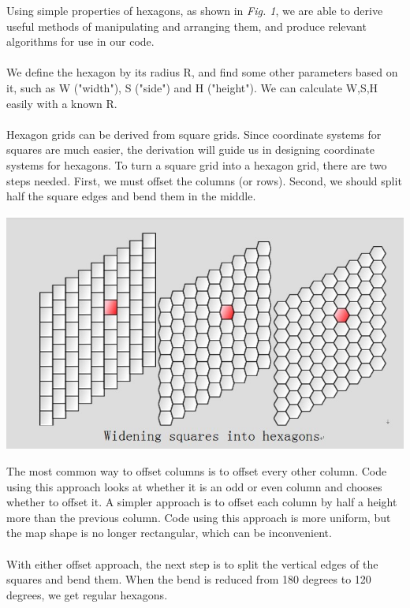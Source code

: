 \documentclass[10pt,a4paper]{article}
\begin{document}
Using simple properties of hexagons, as shown in \textit{Fig. 1}, we are able to derive useful methods of manipulating and arranging them, and produce relevant algorithms for use in our code. \\
\\
We define the hexagon by its radius R, and find some other parameters based on it, such as W ("width"), S ("side") and H ("height"). We can calculate W,S,H easily with a known R.\\
\\
Hexagon grids can be derived from square grids. Since coordinate systems for squares are much easier, the derivation will guide us in designing coordinate systems for hexagons\cite{grids}. To turn a square grid into a hexagon grid, there are two steps needed. First, we must offset the columns (or rows). Second, we should split half the square edges and bend them in the middle.
\begin{center}
\includegraphics[scale=0.5]{image11.jpg}\\
\end{center}
The most common way \cite{gdmath} to offset columns is to offset every other column. Code using this approach looks at whether it is an odd or even column and chooses whether to offset it. A simpler approach is to offset each column by half a height more than the previous column. Code using this approach is more uniform, but the map shape is no longer rectangular, which can be inconvenient.\\
\\
With either offset approach, the next step is to split the vertical edges of the squares and bend them. When the bend is reduced from 180 degrees to 120 degrees, we get regular hexagons.
\end{document}
